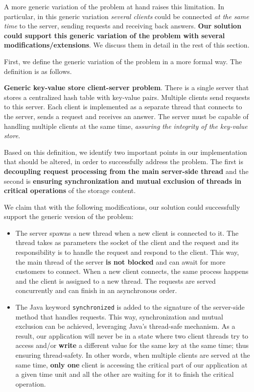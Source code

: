 \documentclass[acmlarge]{acmart}
\begin{document}
A more generic variation of the problem at hand raises this limitation. In particular, in this generic variation \emph{several clients} could be connected \emph{at the same time} to the server, sending requests and receiving back answers. \textbf{Our solution could support this generic variation of the problem with several modifications/extensions}. We discuss them in detail in the rest of this section.

First, we define the generic variation of the problem in a more formal way. The definition is as follows.
\begin{definition}
  \textbf{Generic key-value store client-server problem}. There is a single server that stores a centralized hash table with key-value pairs. Multiple clients send requests to this server. Each client is implemented as a separate thread that connects to the server, sends a request and receives an answer. The server must be capable of handling multiple clients at the same time, \emph{assuring the integrity of the key-value store}.
\end{definition}

Based on this definition, we identify two important points in our implementation that should be altered, in order to successfully address the problem. The first is \textbf{decoupling request processing from the main server-side thread} and the second is \textbf{ensuring synchronization and mutual exclusion of threads in critical operations} of the storage content.

We claim that with the following modifications, our solution could successfully support the generic version of the problem:
\begin{itemize}
  \item The server spawns a new thread when a new client is connected to it. The thread takes as parameters the socket of the client and the request and its responsibility is to handle the request and respond to the client. This way, the main thread of the server \textbf{is not blocked} and can await for more customers to connect. When a new client connects, the same process happens and the client is assigned to a new thread. The requests are served concurrently and can finish in an asynchronous order.
  \item The Java keyword \texttt{synchronized} is added to the signature of the server-side method that handles requests. This way, synchronization and mutual exclusion can be achieved, leveraging Java's thread-safe mechanism. As a result, our application will never be in a state where two client threads try to access and/or \textbf{write} a different value for the same key at the same time; thus ensuring thread-safety. In other words, when multiple clients are served at the same time, \textbf{only one} client is accessing the critical part of our application at a given time unit and all the other are waiting for it to finish the critical operation.
\end{itemize}
\end{document}
